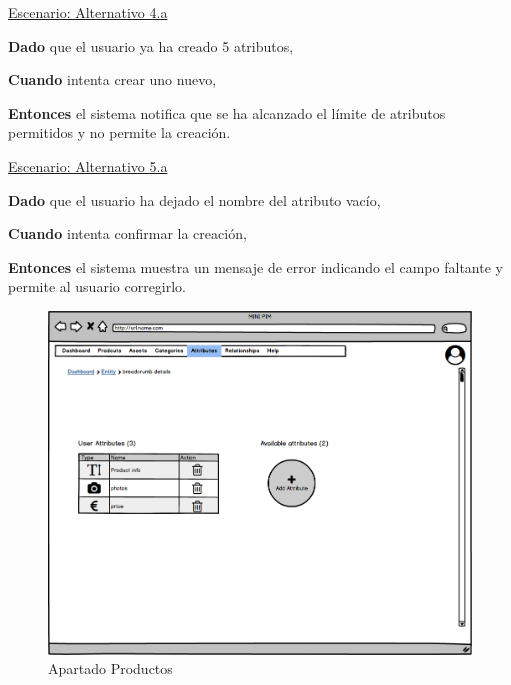 \underline{Escenario: Alternativo 4.a}\par
\vspace{0.15cm}
\textbf{Dado} que el usuario ya ha creado 5 atributos,\par
\textbf{Cuando} intenta crear uno nuevo,\par
\textbf{Entonces} el sistema notifica que se ha alcanzado el límite de atributos permitidos y no permite la creación.\par
\vspace{0.20cm}

\underline{Escenario: Alternativo 5.a}\par
\vspace{0.15cm}
\textbf{Dado} que el usuario ha dejado el nombre del atributo vacío,\par
\textbf{Cuando} intenta confirmar la creación,\par
\textbf{Entonces} el sistema muestra un mensaje de error indicando el campo faltante y permite al usuario corregirlo.\par
\vspace{0.20cm}


\begin{figure}[H]
    \includegraphics[width=1\linewidth]{mockups/RF6.1Crear_Atributo.png}
    \caption{Apartado Productos}
   \end{figure}
\vspace{1.0cm}

